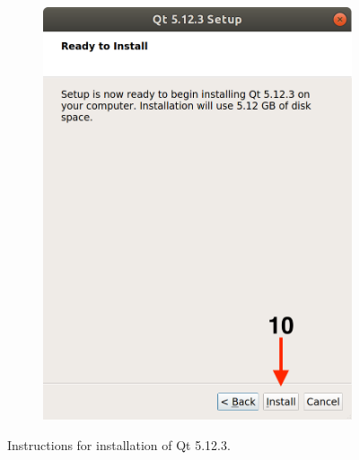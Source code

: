\begin{figure}[H]
\begin{subfigure}{0.32\linewidth}
        \includegraphics[width=1\textwidth]{images/Qt8.png}
    \end{subfigure}
    \caption{Instructions for installation of Qt 5.12.3.}
    \label{fig:Qt}
\end{figure}
